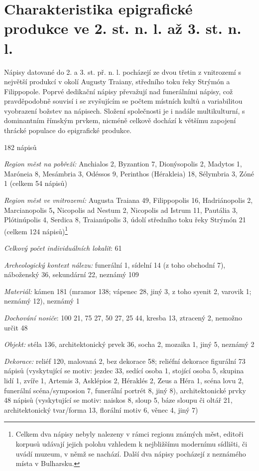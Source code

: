 \section[charakteristika-epigrafické-produkce-ve-2.-st.-n.-l.-až-3.-st.-n.-l.]{Charakteristika epigrafické produkce ve 2. st. n. l. až 3. st. n. l.}

Nápisy datované do 2. a 3. st. př. n. l. pocházejí ze dvou třetin z vnitrozemí s největší produkcí v okolí Augusty Traiany, středního toku řeky Strýmón a Filippopole. Poprvé dedikační nápisy převažují nad funerálními nápisy, což pravděpodobně souvisí i se zvyšujícím se počtem místních kultů a variabilitou vyobrazení božstev na nápisech. Složení společnosti je i nadále multikulturní, s dominantním římským prvkem, nicméně celkově dochází k většímu zapojení thrácké populace do epigrafické produkce.

\placetable[none]{}
\starttable[|l|]
\HL
{} 182 nápisů

{\em Region měst na pobřeží:} Anchialos 2, Byzantion 7, Dionýsopolis 2, Madytos 1, Maróneia 8, Mesámbria 3, Odéssos 9, Perinthos (Hérakleia) 18, Sélymbria 3, Zóné 1 (celkem 54 nápisů)

{\em Region měst ve vnitrozemí:} Augusta Traiana 49, Filippopolis 16, Hadriánopolis 2, Marcianopolis 5{\bf ,} Nicopolis ad Nestum 2, Nicopolis ad Istrum 11, Pautália 3, Plótinúpolis 4, Serdica 8, Traianúpolis 3, údolí středního toku řeky Strýmón 21 (celkem 124 nápisů)\footnote{Celkem dva nápisy nebyly nalezeny v rámci regionu známých měst, editoři korpusů udávají jejich polohu vzhledem k nejbližšímu modernímu sídlišti, či uvádí muzeum, v němž se nachází. Další dva nápisy pocházejí z neznámého místa v Bulharsku.}

{\em Celkový počet individuálních lokalit}: 61

{\em Archeologický kontext nálezu:} funerální 1, sídelní 14 (z toho obchodní 7), náboženský 36, sekundární 22, neznámý 109

{\em Materiál:} kámen 181 (mramor 138; vápenec 28, jiný 3, z toho syenit 2, varovik 1; neznámý 12), neznámý 1

{\em Dochování nosiče}: 100  21, 75  27, 50  27, 25  44, kresba 13, ztracený 2, nemožno určit 48

{\em Objekt:} stéla 136, architektonický prvek 36, socha 2, mozaika 1, jiný 5, neznámý 2

{\em Dekorace:} reliéf 120, malovaná 2, bez dekorace 58; reliéfní dekorace figurální 73 nápisů (vyskytující se motiv: jezdec 33, sedící osoba 1, stojící osoba 5, skupina lidí 1, zvíře 1, Artemis 3, Asklépios 2, Héraklés 2, Zeus a Héra 1, scéna lovu 2, funerální scéna/symposion 7, funerální portrét 8, jiný 8), architektonické prvky 48 nápisů (vyskytující se motiv: naiskos 8, sloup 5, báze sloupu či oltář 21, architektonický tvar/forma 13, florální motiv 6, věnec 4, jiný 7)

